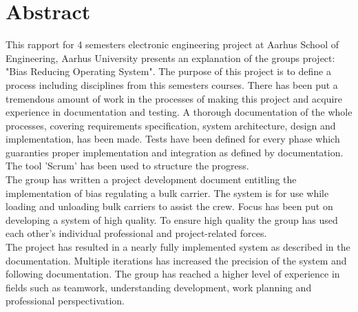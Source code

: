 \chapter{Abstract}
This rapport for 4 semesters electronic engineering project at Aarhus School of Engineering, Aarhus University presents an explanation of the groups project: "Bias Reducing Operating System". The purpose of this project is to define a process including disciplines from this semesters courses. There has been put a tremendous amount of work in the processes of making this project and acquire experience in documentation and testing.  A thorough documentation of the whole processes, covering requirements specification, system architecture, design and implementation, has been made. Tests have been defined for every phase which guaranties proper implementation and integration as defined by documentation. The tool 'Scrum' has been used to structure the progress.\\
The group has written a project development document entitling the implementation of bias regulating a bulk carrier. The system is for use while loading and unloading bulk carriers to assist the crew. Focus has been put on developing a system of high quality. To ensure high quality the group has used each other's individual professional and project-related forces.\\
The project has resulted in a nearly fully implemented system as described in the documentation. Multiple iterations has increased the precision of the system and following documentation. The group has reached a higher level of experience in fields such as teamwork, understanding development, work planning and professional perspectivation.

\newpage